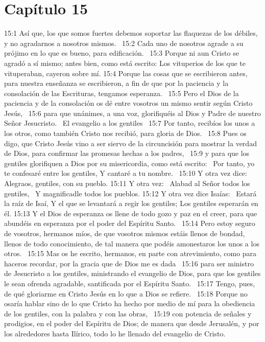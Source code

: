 \section*{Capítulo 15 }

15:1 Así que, los que somos fuertes debemos soportar las flaquezas de los débiles, y no agradarnos a nosotros mismos.  
15:2 Cada uno de nosotros agrade a su prójimo en lo que es bueno, para edificación.  
15:3 Porque ni aun Cristo se agradó a sí mismo; antes bien, como está escrito: Los vituperios de los que te vituperaban, cayeron sobre mí. 
15:4 Porque las cosas que se escribieron antes, para nuestra enseñanza se escribieron, a fin de que por la paciencia y la consolación de las Escrituras, tengamos esperanza.  
15:5 Pero el Dios de la paciencia y de la consolación os dé entre vosotros un mismo sentir según Cristo Jesús,  
15:6 para que unánimes, a una voz, glorifiquéis al Dios y Padre de nuestro Señor Jesucristo.  
El evangelio a los gentiles  
15:7 Por tanto, recibíos los unos a los otros, como también Cristo nos recibió, para gloria de Dios.  
15:8 Pues os digo, que Cristo Jesús vino a ser siervo de la circuncisión para mostrar la verdad de Dios, para confirmar las promesas hechas a los padres,  
15:9 y para que los gentiles glorifiquen a Dios por su misericordia, como está escrito:  
Por tanto, yo te confesaré entre los gentiles, 
Y cantaré a tu nombre.  
15:10 Y otra vez dice:  
Alegraos, gentiles, con su pueblo. 
15:11 Y otra vez:  
Alabad al Señor todos los gentiles,  
Y magnificadle todos los pueblos. 
15:12 Y otra vez dice Isaías:  
Estará la raíz de Isaí, Y el que se levantará a regir los gentiles; Los gentiles esperarán en él. 
15:13 Y el Dios de esperanza os llene de todo gozo y paz en el creer, para que abundéis en esperanza por el poder del Espíritu Santo.  
15:14 Pero estoy seguro de vosotros, hermanos míos, de que vosotros mismos estáis llenos de bondad, llenos de todo conocimiento, de tal manera que podéis amonestaros los unos a los otros.  
15:15 Mas os he escrito, hermanos, en parte con atrevimiento, como para haceros recordar, por la gracia que de Dios me es dada  
15:16 para ser ministro de Jesucristo a los gentiles, ministrando el evangelio de Dios, para que los gentiles le sean ofrenda agradable, santificada por el Espíritu Santo.  
15:17 Tengo, pues, de qué gloriarme en Cristo Jesús en lo que a Dios se refiere.  
15:18 Porque no osaría hablar sino de lo que Cristo ha hecho por medio de mí para la obediencia de los gentiles, con la palabra y con las obras,  
15:19 con potencia de señales y prodigios, en el poder del Espíritu de Dios; de manera que desde Jerusalén, y por los alrededores hasta Ilírico, todo lo he llenado del evangelio de Cristo.  
